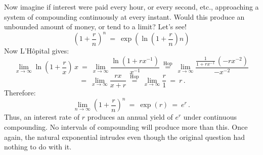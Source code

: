 \documentclass[11pt]{article}
\begin{document}
Now imagine if interest were paid every hour, or every second, etc.,
approaching a system of compounding continuously at every instant. 
Would this produce an unbounded amount of money, or tend to a limit? Let's see!
$$
\left(1+\frac rn\right)^{\!n}
\ =\
\exp\!\left(\ln\!\left(1+\frac rn\right)n\right)
$$
Now L'H\^opital gives:
$$
\lim_{x\to\infty}
\ln\!\left(1+\frac rx\right)\,x
\ =\
\lim_{x\to\infty}
\frac{\ln\!\left(1+rx^{-1}\right)}{x^{-1}}
\ \stackrel{\mathrm{Hop}}{=}\ 
\lim_{x\to\infty}
\frac{\frac{1}{1+rx^{-1}}\,(-rx^{-2})}{-x^{-2}}
$$
$$
\ =\
\lim_{x\to\infty}\frac{rx}{x+r}
\ \stackrel{\mathrm{Hop}}{=}\ 
\lim_{x\to\infty}\frac{r}{1}
\ =\ r\,.
$$
Therefore:
$$
\lim_{n\to\infty}\left(1+\frac rn\right)^{\!n}
\ =\ \exp(r) \ =\  e^r\,.
$$
Thus, an interest rate of $r$ produces an annual yield of $e^r$ under
continuous compounding. No intervals of compounding  will produce more than this. 
Once again, the natural exponential intrudes even though the original question had nothing to do with it.
\end{document}
